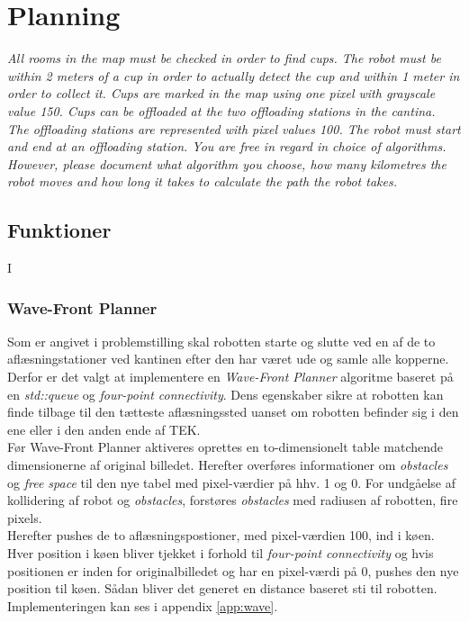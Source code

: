 \section{Planning}
\label{sec:plan}
\textit{All rooms in the map must be checked in order to find cups. The robot must be within 2 meters of a cup in order to actually detect the cup and within 1 meter in order to collect it. Cups are marked in the map using one pixel with grayscale value 150. Cups can be offloaded at the two offloading stations in the cantina. The offloading stations are represented with pixel values 100. The robot must start and end at an offloading station.
You are free in regard in choice of algorithms. However, please document what algorithm you choose, how many kilometres the robot moves and how long it takes to calculate the path the robot takes.}

\subsection{Funktioner}
I

\subsubsection{Wave-Front Planner}
Som er angivet i problemstilling skal robotten starte og slutte ved en af de to aflæsningstationer ved kantinen efter den har været ude og samle alle kopperne. Derfor er det valgt at implementere en \emph{Wave-Front Planner} algoritme baseret på en \emph{std::queue} og \emph{four-point connectivity}. 
Dens egenskaber sikre at robotten kan finde tilbage til den tætteste aflæsningssted uanset om robotten befinder sig i den ene eller i den anden ende af TEK. \\

Før Wave-Front Planner aktiveres oprettes en to-dimensionelt table matchende dimensionerne af original billedet. Herefter overføres informationer om \emph{obstacles} og \emph{free space} til den nye tabel med pixel-værdier på hhv. 1 og 0. For undgåelse af kollidering af robot og \emph{obstacles}, forstøres \emph{obstacles} med radiusen af robotten, fire pixels.\\
Herefter pushes de to aflæsningspostioner, med pixel-værdien 100, ind i køen. \\

Hver position i køen bliver tjekket i forhold til \emph{four-point connectivity} og hvis positionen er inden for originalbilledet og har en pixel-værdi på 0, pushes den nye position til køen. Sådan bliver det generet en distance baseret sti til robotten.\\
Implementeringen kan ses i appendix \ref{app:wave}.
